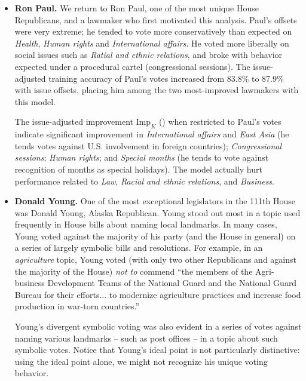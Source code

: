\begin{itemize}
  \item \textbf{Ron Paul.}
We return to Ron Paul, one of the most unique House Republicans, and a
lawmaker who first motivated this analysis.  Paul's offsets were very
extreme; he tended to vote more conservatively than expected on
\emph{Health}, \emph{Human rights} and \emph{International affairs}.
He voted more liberally on social issues such as \emph{Ratial and
  ethnic relations}, and broke with behavior expected under a
procedural cartel (congressional sessions).
The issue-adjusted training accuracy of Paul's votes increased from
83.8\% to 87.9\% with issue offsets, placing him among the two
most-improved lawmakers with this model. %

The issue-adjusted improvement $\mbox{Imp}_K$
() when restricted to
Paul's votes indicate significant improvement in \emph{International
  affairs} and \emph{East Asia} (he tends votes against
U.S. involvement in foreign countries); \emph{Congressional sessions};
\emph{Human rights}; and \emph{Special months} (he tends to vote
against recognition of months as special holidays).  The model
actually hurt performance related to \emph{Law}, \emph{Racial and
  ethnic relations}, and \emph{Business}.
\item \textbf{Donald Young.}
One of the most exceptional legislators in the 111th
House was Donald Young, Alaska Republican.  Young stood out most in a
topic used frequently in House bills about naming local landmarks. In
many cases, Young voted against the majority of his party (and the
House in general) on a series of largely symbolic bills and
resolutions.  For example, in an \emph{agriculture} topic, Young voted
(with only two other Republicans and against the majority of the
House) \emph{not to} commend ``the members of the Agri-business
Development Teams of the National Guard and the National Guard Bureau
for their efforts... to modernize agriculture practices and increase
food production in war-torn countries.'' %

Young's divergent symbolic voting was also evident in a series of
votes against naming various landmarks -- such as post offices -- in a
topic about such symbolic votes.  Notice that Young's ideal point is
not particularly distinctive: using the ideal point alone, we might
not recognize his unique voting behavior.
\end{itemize}


